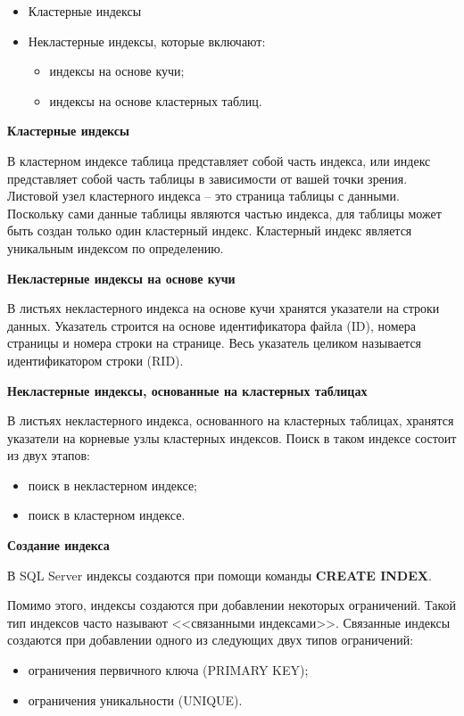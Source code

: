 \begin{itemize}
	\item Кластерные индексы
	\item Некластерные индексы, которые включают: 
	\begin{itemize}[label=--]
		\item индексы на основе кучи;
		\item индексы на основе кластерных таблиц.
	\end{itemize}
\end{itemize}

\textbf{Кластерные индексы}

В кластерном индексе таблица представляет собой часть индекса, или индекс представляет собой часть таблицы в зависимости от вашей точки зрения. Листовой узел кластерного индекса – это страница таблицы с данными. Поскольку сами данные таблицы являются частью индекса, для таблицы может быть создан только один кластерный индекс. Кластерный индекс является уникальным индексом по определению.

\textbf{Некластерные индексы на основе кучи}

В листьях некластерного индекса на основе кучи хранятся указатели на строки данных. Указатель строится на основе идентификатора файла (ID), номера страницы и номера строки на странице. Весь указатель целиком называется идентификатором строки (RID).

\textbf{Некластерные индексы, основанные на кластерных таблицах}

В листьях некластерного индекса, основанного на кластерных таблицах, хранятся указатели на корневые узлы кластерных индексов. Поиск в таком индексе состоит из двух этапов:

\begin{itemize}
	\item поиск в некластерном индексе;
	\item поиск в кластерном индексе.
\end{itemize}

\textbf{Создание индекса}

В SQL Server индексы создаются при помощи команды \textbf{CREATE INDEX}.

Помимо этого, индексы создаются при добавлении некоторых ограничений. Такой тип индексов часто называют <<связанными индексами>>. Связанные индексы создаются при добавлении одного из следующих двух типов ограничений: 
\begin{itemize}
	\item ограничения первичного ключа (PRIMARY KEY); 
	\item ограничения уникальности (UNIQUE). 
\end{itemize}

